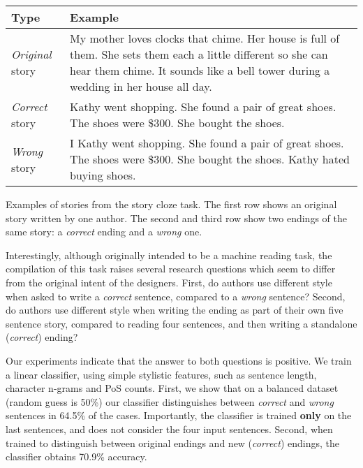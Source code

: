 \documentclass[11pt,a4paper]{article}
\begin{document}
\begin{table}[!t]
\small
\begin{tabular}{|p{.95cm}|p{6cm}|} \hline
{\bf Type} & {\bf Example} \\ \hline
{\it Original} story & My mother loves clocks that chime.	Her house is full of them.	She sets them each a little different so she can hear them chime.	It sounds like a bell tower during a wedding in her house all day.	{\color{blue}{When I visit I stop them or I'd never be able to sleep at night.}} \\ \hline
{\it Correct} story & Kathy went shopping.	She found a pair of great shoes.	The shoes were \$300.	She bought the shoes.	{\color{green}{She felt buyer's remorse after the purchase.}} \\ \hline
{\it Wrong} story & I Kathy went shopping.	She found a pair of great shoes.	The shoes were \$300.	She bought the shoes.	Kathy hated buying shoes.	{\color{red}{Kathy hated buying shoes.}} \\ \hline
\end{tabular}
\caption{\label{ROC-example}}
Examples of stories from the story cloze task. The first row shows an original story written by one author. 
The second and third row show two endings of the same story: a {\it correct} ending and a {\it wrong} one.
\end{table}


Interestingly, although originally intended to be a machine reading task, the compilation of this task raises several research questions which seem to differ from the original intent of the designers.
First, do authors use different style when asked to write a {\it correct} sentence, compared to a {\it wrong} sentence?
Second, do authors use different style when writing the ending as part of their own five sentence story, compared to reading four sentences, and then writing a standalone ({\it correct}) ending?

Our experiments indicate that the answer to both questions is positive. 
We train a linear classifier, using simple stylistic features, such as sentence length, character n-grams and PoS counts. 
First, we show that on a balanced dataset (random guess is 50\%) our classifier distinguishes between {\it correct} and {\it wrong} sentences in 64.5\% of the cases. 
Importantly, the classifier is trained {\bf only} on the last sentences, and does not consider the four input sentences.
Second, when trained to distinguish between original endings and new ({\it correct}) endings, the classifier obtains 70.9\% accuracy. 
\end{document}
